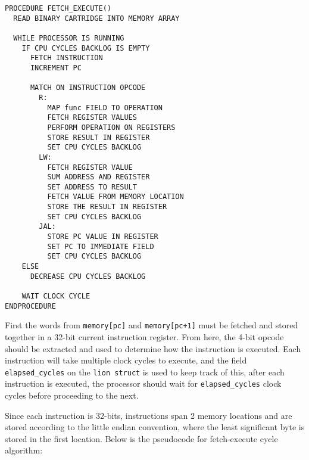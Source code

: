 \begin{lstlisting}
PROCEDURE FETCH_EXECUTE()
  READ BINARY CARTRIDGE INTO MEMORY ARRAY

  WHILE PROCESSOR IS RUNNING
    IF CPU CYCLES BACKLOG IS EMPTY
      FETCH INSTRUCTION 
      INCREMENT PC

      MATCH ON INSTRUCTION OPCODE 
        R: 
          MAP func FIELD TO OPERATION 
          FETCH REGISTER VALUES 
          PERFORM OPERATION ON REGISTERS 
          STORE RESULT IN REGISTER 
          SET CPU CYCLES BACKLOG 
        LW:
          FETCH REGISTER VALUE
          SUM ADDRESS AND REGISTER
          SET ADDRESS TO RESULT
          FETCH VALUE FROM MEMORY LOCATION
          STORE THE RESULT IN REGISTER
          SET CPU CYCLES BACKLOG
        JAL:
          STORE PC VALUE IN REGISTER
          SET PC TO IMMEDIATE FIELD
          SET CPU CYCLES BACKLOG
    ELSE 
      DECREASE CPU CYCLES BACKLOG

    WAIT CLOCK CYCLE
ENDPROCEDURE
\end{lstlisting}

First the words from \texttt{memory[pc]} and \texttt{memory[pc+1]} must be fetched and stored together in a 32-bit current instruction register. From here, the 4-bit opcode should be extracted and used to determine how the instruction is executed. Each instruction will take multiple clock cycles to execute, and the field \texttt{elapsed\_cycles} on the \texttt{lion struct} is used to keep track of this, after each instruction is executed, the processor should wait for \texttt{elapsed\_cycles} clock cycles before proceeding to the next. 

Since each instruction is 32-bits, instructions span 2 memory locations and are stored according to the little endian convention, where the least significant byte is stored in the first location. Below is the pseudocode for fetch-execute cycle algorithm: 

